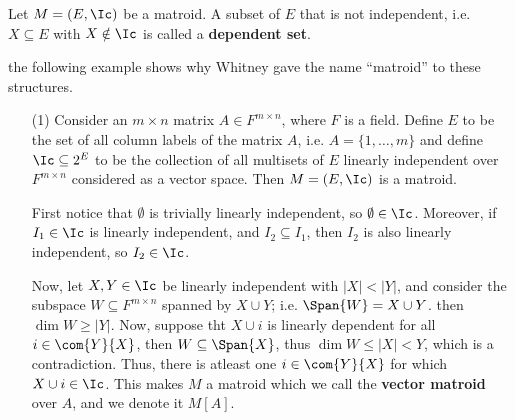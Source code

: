 \begin{definition}
    Let $M=(E,\Ic)$ be a matroid. A subset of $E$ that is not independent, i.e.
    $X \subseteq E$ with  $X \notin \Ic$ is called a \textbf{dependent set}.
\end{definition}

the following example shows why Whitney gave the name ``matroid'' to these
structures.

\begin{example}\label{1.4}
    \begin{enumerate}
        \item[(1)] Consider an $m \times n$ matrix  $A \in F^{m \times n}$,
            where $F$ is a field. Define $E$ to  be the set of all column labels
            of the matrix $A$, i.e.  $A=\{1, \dots, m\}$ and define $\Ic
            \subseteq 2^E$ to be the collection of all multisets of $E$
            linearly independent over $F^{m \times n}$ considered as a vector
            space. Then $M=(E,\Ic)$ is a matroid.

            First notice that $\emptyset$ is trivially linearly independent, so
             $\emptyset \in \Ic$. Moreover, if $I_1 \in \Ic$ is linearly
             independent, and $I_2 \subseteq I_1$, then $I_2$ is also linearly
             independent, so  $I_2 \in \Ic$.

             Now, let $X,Y \in \Ic$ be linearly independent with $|X|<|Y|$, and
             consider the subspace $W \subseteq F^{m \times n}$ spanned by $X
             \cup Y$; i.e. $\Span{W}=X \cup Y$. then $\dim{W} \geq |Y|$. Now,
             suppose tht $X \cup i$ is linearly dependent for all  $i \in
             \com{Y}{X}$, then $W \subseteq \Span{X}$, thus $\dim{W} \leq
             |X|<Y$, which is a contradiction. Thus, there is atleast one $i \in
             \com{Y}{X}$ for which $X \cup i \in \Ic$. This makes $M$ a matroid
             which we call the  \textbf{vector matroid} over $A$, and we denote
             it $M[A]$.


\end{enumerate}
\end{example}
